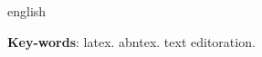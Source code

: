 \begin{resumo}[Abstract]
 \begin{otherlanguage*}{english}
   \lipsum[8]

   \vspace{\onelineskip}
 
   \noindent 
   \textbf{Key-words}: latex. abntex. text editoration.
 \end{otherlanguage*}
\end{resumo}

